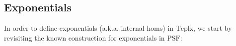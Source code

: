\documentclass{article}
\newtheorem{theorem}{Theorem}[subsection]
\theoremstyle{remark}
\theoremstyle{definition}
\newcommand{\N}{\mathbb N}
\newcommand{\Fin}{\mathrm{Fin}}
\newcommand{\Set}{\mathrm{Set}}
\newcommand{\PSF}{\mathrm{PSF}}
\newcommand{\op}{\mathrm{op}}
\newcommand{\id}{\mathrm{id}}
\newcommand{\Tcplx}{\mathrm{Tcplx}}
\newcommand{\M}{\mathcal M}
\newcommand{\Nat}{\mathrm{Nat}}
\begin{document}
	\subsection{Exponentials}
	In order to define exponentials (a.k.a. internal homs) in $\Tcplx$, we start by revisiting the known construction for exponentials in $\PSF$:
	\begin{comment}
	\begin{theorem}\label{PSFCCC}
		For $P,Q:\Fin_+^\op\to\Set$, define the exponential $Q^P:\Fin_+^\op\to\Set$ as follows
		\begin{align*}
			Q^P(n)&:=\Nat(P,Q\circ\M(n))\\
			Q^P(f)&:Q^P(n)\to Q^P(m)\quad(\mathrm{for }\ f:m\to n)\\
			&\quad\qquad\eta\mapsto(\id_Q*\M(f))\circ\eta
		\end{align*}
		This makes $\PSF$ into a cartesian closed category. In particular, we have the following isomorphism that is natural in $P,Q,R$:
		\[\iota_{P,Q,R}:\Nat(P\times Q, R)\xrightarrow{\sim}\Nat(P,R^Q)\]
	\end{theorem}
	\begin{proof}
		We start by defining $\iota$. Expanding the definition step by step, here's what we need to define
		\begin{align*}
			\iota_{P,Q,R}&:\Nat(P\times Q, R)\to\Nat(P, R^Q)\\
			\iota_{P,Q,R}(\eta)&:P\to R^Q\\
			\iota_{P,Q,R}(\eta)_m&:P(m)\to R^Q(m)=\Nat(Q, R\circ\M(m))\\
			\iota_{P,Q,R}(\eta)_m(x)&:Q\to R\circ\M(m)\\
			\iota_{P,Q,R}(\eta)_m(x)_n&:Q(n)\to R(m\times n)
			\intertext{With $\eta:P\times Q\to R$, $m,n\in\N_+$ and $x\in P(m)$ arbitrary. We can now give an explicit expression for the last function:}
			&y\mapsto\eta_{m\times n}(P(\pi^1_{m,n})(x), Q(\pi^2_{m,n})(y))
		\end{align*}
		As it is rather tedious and boring to check that this is indeed a well-defined natural transformation, it is left as an exercise for the curious (or simply bored) reader. To show that this is an isomorphism, we give an explicit definition for its inverse, which we shall call $\kappa$. To define it we again expand the definition step by step:
		\begin{align*}
			\kappa_{P,Q,R}&:\Nat(P, R^Q)\to\Nat(P\times Q, R)\\
			\kappa_{P,Q,R}(\varepsilon)&:P\times Q\to R\\

\end{comment}
\end{document}
